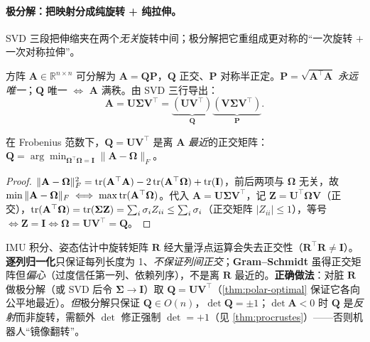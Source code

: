 \paragraph{极分解：把映射分成纯旋转 + 纯拉伸。}
SVD 三段把伸缩夹在两个\emph{无关}旋转中间；极分解把它重组成更对称的“一次旋转 $+$ 一次对称拉伸”。

\begin{theorem}[极分解]\label{thm:polar}
方阵 $\mathbf{A}\in\mathbb{R}^{n\times n}$ 可分解为 $\mathbf{A}=\mathbf{Q}\mathbf{P}$，$\mathbf{Q}$ 正交、$\mathbf{P}$ 对称半正定。$\mathbf{P}=\sqrt{\mathbf{A}^\top\mathbf{A}}$ \emph{永远唯一}；$\mathbf{Q}$ 唯一 $\iff$ $\mathbf{A}$ 满秩。由 SVD 三行导出：
\begin{equation}
  \mathbf{A}=\mathbf{U}\boldsymbol{\Sigma}\mathbf{V}^\top=\underbrace{(\mathbf{U}\mathbf{V}^\top)}_{\mathbf{Q}}\underbrace{(\mathbf{V}\boldsymbol{\Sigma}\mathbf{V}^\top)}_{\mathbf{P}}.
  \label{eq:polar}
\end{equation}
\end{theorem}

\begin{theorem}[极分解正交因子的最优性]\label{thm:polar-optimal}
在 Frobenius 范数下，$\mathbf{Q}=\mathbf{U}\mathbf{V}^\top$ 是离 $\mathbf{A}$ \emph{最近}的正交矩阵：$\mathbf{Q}=\arg\min_{\boldsymbol{\Omega}^\top\boldsymbol{\Omega}=\mathbf{I}}\|\mathbf{A}-\boldsymbol{\Omega}\|_F$。
\end{theorem}
\begin{proof}
$\|\mathbf{A}-\boldsymbol{\Omega}\|_F^2=\operatorname{tr}(\mathbf{A}^\top\mathbf{A})-2\operatorname{tr}(\mathbf{A}^\top\boldsymbol{\Omega})+\operatorname{tr}(\mathbf{I})$，前后两项与 $\boldsymbol{\Omega}$ 无关，故 $\min\|\mathbf{A}-\boldsymbol{\Omega}\|_F\iff\max\operatorname{tr}(\mathbf{A}^\top\boldsymbol{\Omega})$。代入 $\mathbf{A}=\mathbf{U}\boldsymbol{\Sigma}\mathbf{V}^\top$，记 $\mathbf{Z}=\mathbf{U}^\top\boldsymbol{\Omega}\mathbf{V}$（正交），$\operatorname{tr}(\mathbf{A}^\top\boldsymbol{\Omega})=\operatorname{tr}(\boldsymbol{\Sigma}\mathbf{Z})=\sum_i\sigma_iZ_{ii}\le\sum_i\sigma_i$（正交矩阵 $|Z_{ii}|\le1$），等号 $\iff\mathbf{Z}=\mathbf{I}\iff\boldsymbol{\Omega}=\mathbf{U}\mathbf{V}^\top=\mathbf{Q}$。
\end{proof}

\begin{pitfall}
IMU 积分、姿态估计中旋转矩阵 $\mathbf{R}$ 经大量浮点运算会失去正交性（$\mathbf{R}^\top\mathbf{R}\neq\mathbf{I}$）。\textbf{逐列归一化}只保证每列长度为 1、\emph{不保证列间正交}；\textbf{Gram--Schmidt} 虽得正交矩阵但\emph{偏心}（过度信任第一列、依赖列序），不是离 $\mathbf{R}$ 最近的。\textbf{正确做法}：对脏 $\mathbf{R}$ 做极分解（或 SVD 后令 $\boldsymbol{\Sigma}\to\mathbf{I}$）取 $\mathbf{Q}=\mathbf{U}\mathbf{V}^\top$（\cref{thm:polar-optimal} 保证它各向公平地最近）。\emph{但}极分解只保证 $\mathbf{Q}\in O(n)$，$\det\mathbf{Q}=\pm1$；$\det\mathbf{A}<0$ 时 $\mathbf{Q}$ 是\emph{反射}而非旋转，需额外 $\det$ 修正强制 $\det=+1$（见 \cref{thm:procrustes}）——否则机器人“镜像翻转”。
\end{pitfall}

